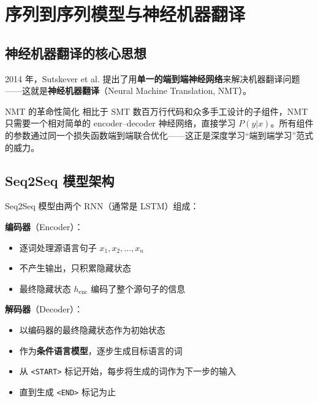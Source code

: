 \documentclass[a4paper]{article}
\begin{document}

\section{序列到序列模型与神经机器翻译}

\subsection{神经机器翻译的核心思想}

2014 年，Sutskever et al. 提出了用\textbf{单一的端到端神经网络}来解决机器翻译问题——这就是\textbf{神经机器翻译}（Neural Machine Translation, NMT）。





\begin{importantbox}{NMT 的革命性简化}
相比于 SMT 数百万行代码和众多手工设计的子组件，NMT 只需要一个相对简单的 encoder--decoder 神经网络，直接学习 $P(y|x)$。所有组件的参数通过同一个损失函数端到端联合优化——这正是深度学习``端到端学习''范式的威力。
\end{importantbox}

\subsection{Seq2Seq 模型架构}





Seq2Seq 模型由两个 RNN（通常是 LSTM）组成：

\textbf{编码器}（Encoder）：
\begin{itemize}
    \item 逐词处理源语言句子 $x_1, x_2, \ldots, x_n$
    \item 不产生输出，只积累隐藏状态
    \item 最终隐藏状态 $h_{\text{enc}}$ 编码了整个源句子的信息
\end{itemize}

\textbf{解码器}（Decoder）：
\begin{itemize}
    \item 以编码器的最终隐藏状态作为初始状态
    \item 作为\textbf{条件语言模型}，逐步生成目标语言的词
    \item 从 \texttt{<START>} 标记开始，每步将生成的词作为下一步的输入
    \item 直到生成 \texttt{<END>} 标记为止
\end{itemize}
\end{document}
